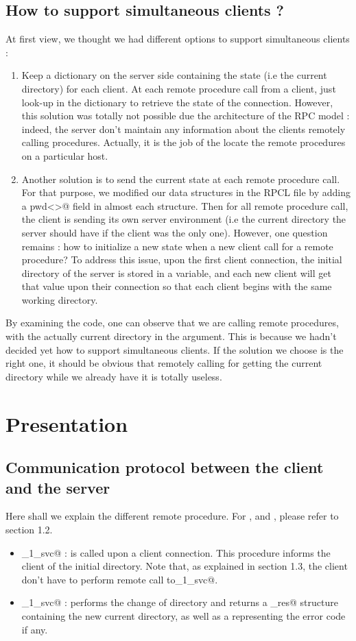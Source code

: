 \documentclass{article}
\begin{document}
\subsection{How to support simultaneous clients ?}
At first view, we thought we had different options to support simultaneous clients :
\begin{enumerate}
\item Keep a dictionary on the server side containing the state (i.e the current directory) for each client. At each remote procedure call from a client, just look-up in the dictionary to retrieve the state of the connection. However, this solution was totally not possible due the architecture of the RPC model : indeed, the server don't maintain any information about the clients remotely calling procedures. Actually, it is the job of the \verb@PortMapper@ locate the remote procedures on a particular host.
\item Another solution is to send the current state at each remote procedure call. For that purpose, we modified our data structures in the RPCL file by adding a \verb@string pwd<>@ field in almost each structure. Then for all remote procedure call, the client is sending its own server environment (i.e the current directory the server should have if the client was the only one). However, one question remains : how to initialize a new state when a new client call for a remote procedure? To address this issue, upon the first client connection, the initial directory of the server is stored in a variable, and each new client will get that value upon their connection so that each client begins with the same working directory.
\end{enumerate}
By examining the code, one can observe that we are calling \verb@PWD@ remote procedures, with the actually current directory in the argument. This is because we hadn't decided yet how to support simultaneous clients. If the solution we choose is the right one, it should be obvious that remotely calling for getting the current directory while we already have it is totally useless.

\section{Presentation}
\subsection{Communication protocol between the client and the server}
Here shall we explain the different remote procedure. For \verb@get@, \verb@ls@ and \verb@put@, please refer to section 1.2.
\begin{itemize}
\item \verb@rpwd_1_svc@ : is called upon a client connection. This procedure informs the client of the initial directory. Note that, as explained in section 1.3, the client don't have to perform remote call to\verb@rpwd_1_svc@.
\item \verb@rcd_1_svc@ : performs the change of directory and returns a \verb@cd_res@ structure containing the new current directory, as well as a \verb@int@ representing the error code if any.
\end{itemize}
\end{document}
